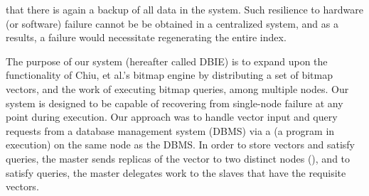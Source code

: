 that there is again a backup of all data in the system. Such resilience to
hardware (or software) failure cannot be be obtained in a centralized system,
and as a results, a failure would necessitate regenerating the entire index.
\par
The purpose of our system (hereafter called DBIE) is to expand upon the
functionality of Chiu, et al.'s bitmap engine by distributing a set of bitmap
vectors, and the work of executing bitmap queries, among multiple nodes. Our
system is designed to be capable of recovering from single-node failure at any
point during execution. Our approach was to handle vector input and query
requests from a database management system (DBMS) via a 
 (a program in execution) on the same node as the
DBMS. In order to store vectors and satisfy queries, the master sends
replicas of the vector to two distinct nodes (), and to satisfy
queries, the master delegates work to the slaves that have the requisite
vectors.
\par
%
%
